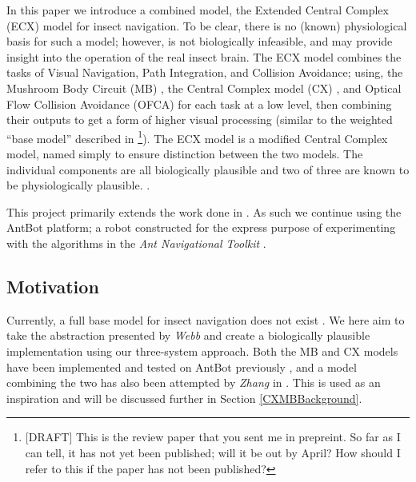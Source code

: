 \documentclass[a4paper,11pt,twoside,openright]{article}
\begin{document}
In this paper we introduce a combined model, the Extended Central Complex (ECX)
model for insect
navigation. To be clear, there is no (known) physiological basis for such a
model; however, is not biologically infeasible, and may provide insight into
the operation of the real insect brain. The ECX model combines the tasks of
Visual Navigation, Path Integration, and Collision Avoidance; using, the Mushroom
Body Circuit (MB) \cite{Ardin2016}, the Central Complex model (CX)
\cite{Stone2017}, and Optical Flow Collision Avoidance (OFCA) \cite{Mitchell2018}
for each task at a low level, then combining their outputs to get a form of
higher visual processing (similar to the weighted ``base model'' described in
\cite{Webb2018}\footnote{[DRAFT] This is the review paper that you sent me in
  prepreint. So far as I can tell, it has not yet been published; will it be out
  by April? How should I refer to this if the paper has not been published?}).
The ECX model is a modified Central Complex model, named simply
to ensure distinction between the two models. The individual components are all
biologically plausible and two of three are known to be physiologically
plausible. \cite{Ardin2016, Stone2017, Mitchell2018}.
\newline
\par

This project primarily extends the work done in \cite{Mitchell2018}. As such we
continue using the AntBot platform; a robot constructed for the express purpose
of experimenting with the algorithms in the \textit{Ant Navigational Toolkit}
\cite{Eberding2016, Wehner2009}.

\subsection{ Motivation }
Currently, a full base model for insect navigation does not exist
\cite{Webb2018}. We here aim to take the abstraction presented by \textit{Webb}
and create a biologically plausible implementation using our three-system
approach. Both the MB and CX models have been implemented and tested on AntBot
previously \cite{Scimeca2017, Mitchell2018, Eberding2016, Zhang2017}, and a model
combining the two has also been attempted by \textit{Zhang} in \cite{Zhang2017}.
This is used as an inspiration and will be discussed further in Section
\ref{CXMBBackground}.
\newline
\par
\end{document}
